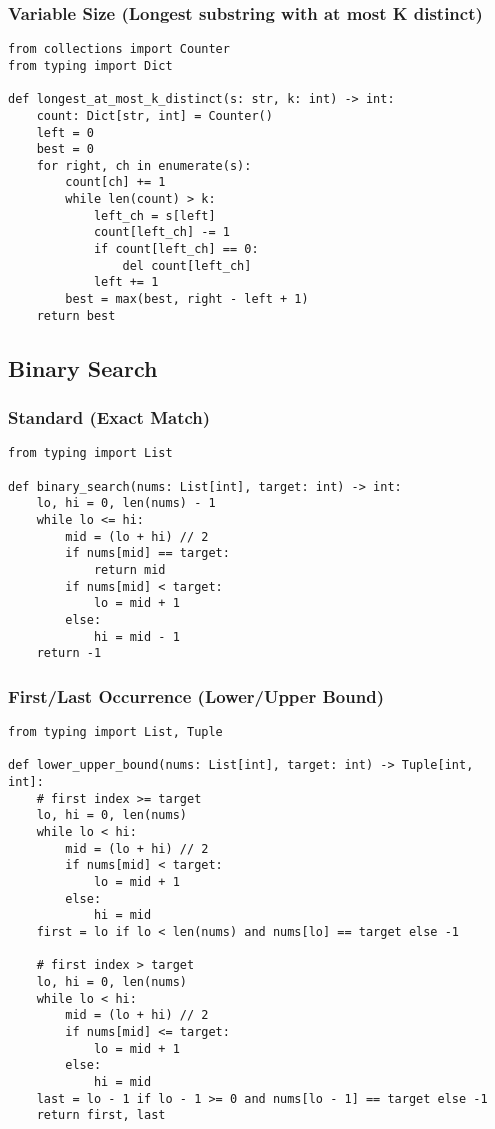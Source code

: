 \documentclass[11pt]{article}
\begin{document}
\subsubsection*{Variable Size (Longest substring with at most K distinct)}
\begin{lstlisting}[style=py,caption={Generic variable-size window}]
from collections import Counter
from typing import Dict

def longest_at_most_k_distinct(s: str, k: int) -> int:
    count: Dict[str, int] = Counter()
    left = 0
    best = 0
    for right, ch in enumerate(s):
        count[ch] += 1
        while len(count) > k:
            left_ch = s[left]
            count[left_ch] -= 1
            if count[left_ch] == 0:
                del count[left_ch]
            left += 1
        best = max(best, right - left + 1)
    return best
\end{lstlisting}

\subsection{Binary Search}
\subsubsection*{Standard (Exact Match)}
\begin{lstlisting}[style=py,caption={Binary search on sorted array}]
from typing import List

def binary_search(nums: List[int], target: int) -> int:
    lo, hi = 0, len(nums) - 1
    while lo <= hi:
        mid = (lo + hi) // 2
        if nums[mid] == target:
            return mid
        if nums[mid] < target:
            lo = mid + 1
        else:
            hi = mid - 1
    return -1
\end{lstlisting}

\subsubsection*{First/Last Occurrence (Lower/Upper Bound)}
\begin{lstlisting}[style=py,caption={Lower and upper bound}]
from typing import List, Tuple

def lower_upper_bound(nums: List[int], target: int) -> Tuple[int, int]:
    # first index >= target
    lo, hi = 0, len(nums)
    while lo < hi:
        mid = (lo + hi) // 2
        if nums[mid] < target:
            lo = mid + 1
        else:
            hi = mid
    first = lo if lo < len(nums) and nums[lo] == target else -1

    # first index > target
    lo, hi = 0, len(nums)
    while lo < hi:
        mid = (lo + hi) // 2
        if nums[mid] <= target:
            lo = mid + 1
        else:
            hi = mid
    last = lo - 1 if lo - 1 >= 0 and nums[lo - 1] == target else -1
    return first, last
\end{lstlisting}
\end{document}
